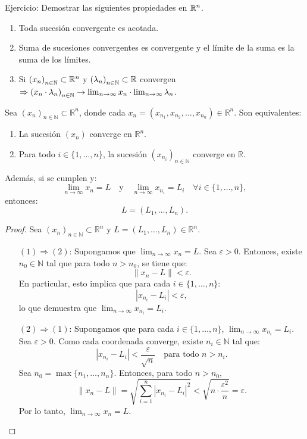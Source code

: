 \begin{prop}
  Ejercicio: Demostrar las siguientes propiedades en \(\mathbb{R}^n\).
  \begin{enumerate}
    \item Toda sucesión convergente es acotada.
    \item Suma de sucesiones convergentes es convergente y el límite de la suma es la suma de los límites.
    \item Si \({(x_n)}_{n \in \mathbb{N}} \subset \mathbb{R}^n\) y \({(\lambda_n)}_{n \in \mathbb{N}} \subset \mathbb{R} \) convergen \(\Rightarrow {(x_n \cdot \lambda_n)}_{n \in \mathbb{N}} \to \lim_{n \to \infty} x_n \cdot \lim_{n \to \infty} \lambda_n\).
  \end{enumerate}
\end{prop}

\begin{prop}
  Sea \({(x_n)}_{n \in \mathbb{N}} \subset \mathbb{R}^n\), donde cada \(x_n = (x_{n_1}, x_{n_2}, \ldots, x_{n_n}) \in \mathbb{R}^n\). Son equivalentes:
  \begin{enumerate}
    \item La sucesión \((x_n)\) converge en \(\mathbb{R}^n\).
    \item Para todo \(i \in \{1, \ldots, n\} \), la sucesión \({(x_{n_i})}_{n \in \mathbb{N}} \) converge en \(\mathbb{R} \).
  \end{enumerate}
  Además, si se cumplen y:
  \[
    \lim_{n \to \infty} x_n = L \quad \text{y} \quad \lim_{n \to \infty} x_{n_i} = L_i \quad \forall i \in \{1, \ldots, n\},
  \]
  entonces:
  \[
    L = (L_1, \ldots, L_n).
  \]
  \begin{proof}
    Sea \({(x_n)}_{n \in \mathbb{N}} \subset \mathbb{R}^n\) y \(L = (L_1, \ldots, L_n) \in \mathbb{R}^n\).
    \begin{enumerate}
      \item[\((1) \Rightarrow (2)\):] Supongamos que \(\lim_{n \to \infty} x_n = L\). Sea \(\varepsilon > 0\). Entonces, existe \(n_0 \in \mathbb{N} \) tal que para todo \(n > n_0\), se tiene que:
            \[
              \|x_n - L\| < \varepsilon.
            \]
            En particular, esto implica que para cada \(i \in \{1, \ldots, n\} \):
            \[
              |x_{n_i} - L_i| < \varepsilon,
            \]
            lo que demuestra que \(\lim_{n \to \infty} x_{n_i} = L_i\).

      \item[\((2) \Rightarrow (1)\):] Supongamos que para cada \(i \in \{1, \ldots, n\} \), \(\lim_{n \to \infty} x_{n_i} = L_i\). Sea \(\varepsilon > 0\). Como cada coordenada converge, existe \(n_i \in \mathbb{N} \) tal que:
            \[
              |x_{n_i} - L_i| < \frac{\varepsilon}{\sqrt{n}} \quad \text{para todo } n > n_i.
            \]
            Sea \(n_0 = \max \{n_1, \ldots, n_n\} \). Entonces, para todo \(n > n_0\),
            \[
              \|x_n - L\| = \sqrt{ \sum_{i=1}^n |x_{n_i} - L_i|^2 } < \sqrt{ n \cdot \frac{\varepsilon^2}{n} } = \varepsilon.
            \]
            Por lo tanto, \(\lim_{n \to \infty} x_n = L\).
    \end{enumerate}
  \end{proof}
\end{prop}

